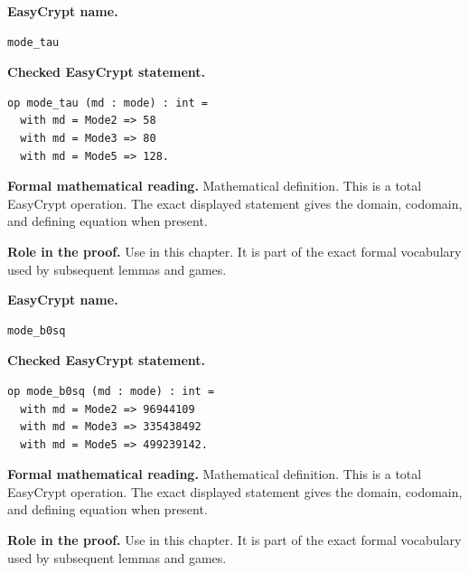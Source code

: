 \begin{formaldefinition}
\noindent\textbf{EasyCrypt name.}
\begin{lstlisting}[language=EasyCrypt,basicstyle=\ttfamily\scriptsize]
mode_tau
\end{lstlisting}
\noindent\textbf{Checked EasyCrypt statement.}
\begin{lstlisting}[language=EasyCrypt,basicstyle=\ttfamily\scriptsize]
op mode_tau (md : mode) : int =
  with md = Mode2 => 58
  with md = Mode3 => 80
  with md = Mode5 => 128.
\end{lstlisting}
\noindent\textbf{Formal mathematical reading.}
Mathematical definition. This is a total EasyCrypt operation.  The exact displayed statement gives the domain, codomain, and defining equation when present.

\noindent\textbf{Role in the proof.}
Use in this chapter. It is part of the exact formal vocabulary used by subsequent lemmas and games.

\end{formaldefinition}

\begin{formaldefinition}
\noindent\textbf{EasyCrypt name.}
\begin{lstlisting}[language=EasyCrypt,basicstyle=\ttfamily\scriptsize]
mode_b0sq
\end{lstlisting}
\noindent\textbf{Checked EasyCrypt statement.}
\begin{lstlisting}[language=EasyCrypt,basicstyle=\ttfamily\scriptsize]
op mode_b0sq (md : mode) : int =
  with md = Mode2 => 96944109
  with md = Mode3 => 335438492
  with md = Mode5 => 499239142.
\end{lstlisting}
\noindent\textbf{Formal mathematical reading.}
Mathematical definition. This is a total EasyCrypt operation.  The exact displayed statement gives the domain, codomain, and defining equation when present.

\noindent\textbf{Role in the proof.}
Use in this chapter. It is part of the exact formal vocabulary used by subsequent lemmas and games.

\end{formaldefinition}

